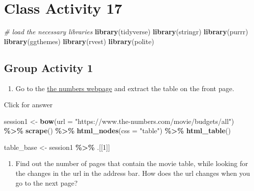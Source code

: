 \documentclass[
]{book}
\newenvironment{Shaded}{\begin{snugshade}}{\end{snugshade}}
\newcommand{\AttributeTok}[1]{\textcolor[rgb]{0.13,0.29,0.53}{#1}}
\newcommand{\CommentTok}[1]{\textcolor[rgb]{0.56,0.35,0.01}{\textit{#1}}}
\newcommand{\DecValTok}[1]{\textcolor[rgb]{0.00,0.00,0.81}{#1}}
\newcommand{\FunctionTok}[1]{\textcolor[rgb]{0.13,0.29,0.53}{\textbf{#1}}}
\newcommand{\NormalTok}[1]{#1}
\newcommand{\OtherTok}[1]{\textcolor[rgb]{0.56,0.35,0.01}{#1}}
\newcommand{\SpecialCharTok}[1]{\textcolor[rgb]{0.81,0.36,0.00}{\textbf{#1}}}
\newcommand{\StringTok}[1]{\textcolor[rgb]{0.31,0.60,0.02}{#1}}
\providecommand{\tightlist}{%
  \setlength{\itemsep}{0pt}\setlength{\parskip}{0pt}}
\begin{document}
\hypertarget{class-activity-17}{%
\chapter{Class Activity 17}\label{class-activity-17}}

\begin{Shaded}
\begin{Highlighting}[]
\CommentTok{\# load the necessary libraries}
\FunctionTok{library}\NormalTok{(tidyverse)}
\FunctionTok{library}\NormalTok{(stringr)}
\FunctionTok{library}\NormalTok{(purrr)}
\FunctionTok{library}\NormalTok{(ggthemes)}
\FunctionTok{library}\NormalTok{(rvest)}
\FunctionTok{library}\NormalTok{(polite)}
\end{Highlighting}
\end{Shaded}

\hypertarget{group-activity-1-4}{%
\section{Group Activity 1}\label{group-activity-1-4}}

\begin{enumerate}
\def\labelenumi{\arabic{enumi}.}
\tightlist
\item
  Go to the \href{https://www.the-numbers.com/movie/budgets/all}{the numbers webpage} and extract the table on the front page.
\end{enumerate}

Click for answer

\begin{Shaded}
\begin{Highlighting}[]
\NormalTok{session1 }\OtherTok{\textless{}{-}} \FunctionTok{bow}\NormalTok{(}\AttributeTok{url =} \StringTok{"https://www.the{-}numbers.com/movie/budgets/all"}\NormalTok{) }\SpecialCharTok{\%\textgreater{}\%} \FunctionTok{scrape}\NormalTok{() }\SpecialCharTok{\%\textgreater{}\%}
  \FunctionTok{html\_nodes}\NormalTok{(}\AttributeTok{css =} \StringTok{"table"}\NormalTok{) }\SpecialCharTok{\%\textgreater{}\%}
  \FunctionTok{html\_table}\NormalTok{()}

\NormalTok{table\_base }\OtherTok{\textless{}{-}}\NormalTok{ session1 }\SpecialCharTok{\%\textgreater{}\%}\NormalTok{ .[[}\DecValTok{1}\NormalTok{]]}
\end{Highlighting}
\end{Shaded}

\begin{enumerate}
\def\labelenumi{\arabic{enumi}.}
\setcounter{enumi}{1}
\tightlist
\item
  Find out the number of pages that contain the movie table, while looking for the changes in the url in the address bar. How does the url changes when you go to the next page?
\end{enumerate}
\end{document}
